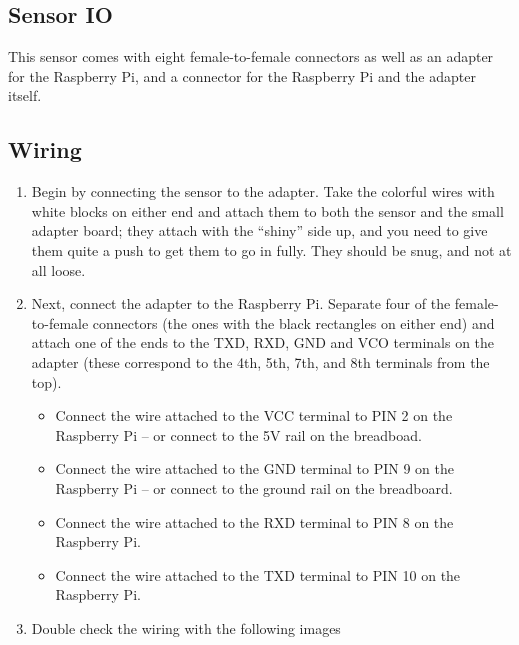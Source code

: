 \documentclass{article}
\begin{document}
\subsection{Sensor IO}

This sensor comes with eight female-to-female connectors as well as an adapter for the Raspberry Pi, and a connector for the Raspberry Pi and the adapter itself.  

\subsection{Wiring}

\begin{enumerate}
  \item Begin by connecting the sensor to the adapter. Take the colorful wires with white blocks on either end and attach them to both the sensor and the small adapter board; they attach with the ``shiny'' side up, and you need to give them quite a push to get them to go in fully. They should be snug, and not at all loose.

  \item Next, connect the adapter to the Raspberry Pi.  Separate four of the female-to-female connectors (the ones with the black rectangles on either end) and attach one of the ends to the TXD, RXD, GND and VCO terminals on the adapter (these correspond to the 4th, 5th, 7th, and 8th terminals from the top).  

\begin{itemize}
  \item Connect the wire attached to the VCC terminal to PIN 2 on the Raspberry Pi -- or connect to the 5V rail on the breadboad.

  \item Connect the wire attached to the GND terminal to PIN 9 on the Raspberry Pi -- or connect to the ground rail on the breadboard. 

  \item Connect the wire attached to the RXD terminal to PIN 8 on the Raspberry Pi. 

  \item Connect the wire attached to the TXD terminal to PIN 10 on the Raspberry Pi.
\end{itemize}

\item Double check the wiring with the following images

\end{enumerate}
\end{document}

